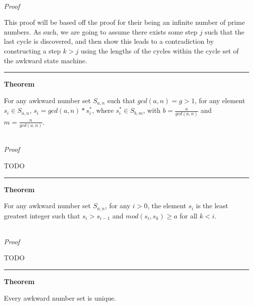 \documentclass[a4paper,12pt]{article}
\begin{document}
\noindent \\
\textit{Proof}

\noindent This proof will be based off the proof for their being an infinite number of prime numbers. As such, we are going to assume there exists some step $j$ such that the last cycle is discovered, and then show this leads to a contradiction by constructing a step $k > j$ using the lengths of the cycles within the cycle set of the awkward state machine.

\begin{center}
\noindent\rule{8cm}{0.4pt}
\end{center}

\label{lemma:min_cycle_length}
\hypertarget{theorem:similar_awkward_series}{}
\begin{tcolorbox}
\textbf{Theorem}

For any awkward number set $S_{a,n}$ such that $gcd(a, n) = g > 1$, for any element $s_i \in S_{a,n}$, $s_i = gcd(a,n)*s^*_i$, where $s^*_i \in S_{b, m}$, with $b = \frac{a}{gcd(a,n)}$ and $m = \frac{n}{gcd(a,n)}$.
\end{tcolorbox}

\noindent \\
\textit{Proof}

TODO

\begin{center}
\noindent\rule{8cm}{0.4pt}
\end{center}

\label{lemma:min_cycle_length}
\hypertarget{theorem:modularity_of_awkward_numbers}{}
\begin{tcolorbox}
\textbf{Theorem}

For any awkward number set $S_{a,n}$, for any $i > 0$, the element $s_i$ is the least greatest integer such that $s_i > s_{i-1}$ and $mod(s_i, s_k) \geq a$ for all $k < i$. 
\end{tcolorbox}

\noindent \\
\textit{Proof}

TODO

\begin{center}
\noindent\rule{8cm}{0.4pt}
\end{center}

\label{lemma:min_cycle_length}
\hypertarget{theorem:uniqueness_of_awkward_numbers}{}
\begin{tcolorbox}
\textbf{Theorem}

Every awkward number set is unique.
\end{tcolorbox}
\end{document}
